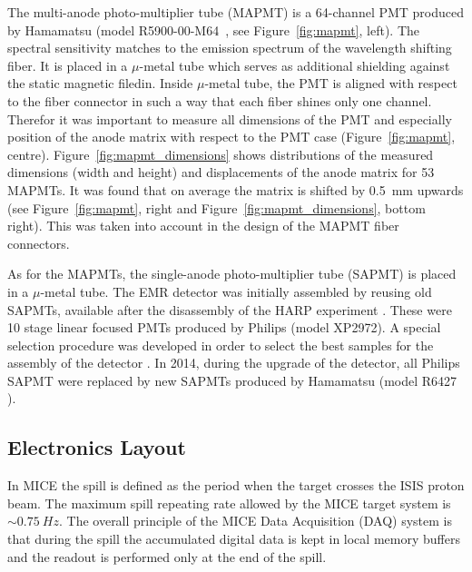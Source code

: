 \documentclass[a4paper,11pt]{article}
\begin{document}
The multi-anode photo-multiplier tube (MAPMT) is a 64-channel PMT produced by Hamamatsu (model R5900-00-M64~\cite{hamamatsu_mapmt}, see
Figure~\ref{fig:mapmt}, left). The spectral sensitivity matches to the emission spectrum of the wavelength shifting fiber. It is 
placed in a $\mu$-metal tube  which serves as additional shielding against the static magnetic filedin. Inside $\mu$-metal tube, the PMT
is aligned with respect to the fiber connector in such a way that each fiber shines only one
channel. Therefor it was important to measure all dimensions of the PMT and especially position of the anode matrix with respect to the
PMT case (Figure~\ref{fig:mapmt}, centre). Figure~\ref{fig:mapmt_dimensions} shows distributions of the measured dimensions (width and
height) and displacements of the anode matrix for 53 MAPMTs. It was found that on average the matrix is shifted by 0.5~mm upwards (see
Figure~\ref{fig:mapmt}, right and Figure~\ref{fig:mapmt_dimensions}, bottom right). This was taken into account in the design of the
MAPMT fiber connectors.

As for the MAPMTs, the single-anode photo-multiplier tube (SAPMT) is placed in a $\mu$-metal tube. The EMR detector was initially assembled
by reusing old SAPMTs, available after the disassembly of the HARP experiment \cite{harp}. These were 10 stage linear focused PMTs produced
by Philips (model XP2972). A special selection procedure was developed in order to select the best samples for the assembly of the detector
\cite{philips}. In 2014, during the upgrade of the detector, all Philips SAPMT were replaced by new SAPMTs produced by Hamamatsu (model R6427
\cite{hamamatsu_mapmt}).

\subsection{Electronics Layout}
In MICE the spill is defined as the period when the target crosses the ISIS proton beam. The maximum spill repeating rate allowed by the
MICE target system is $\sim 0.75 \ Hz$. The overall principle of the MICE Data Acquisition (DAQ) system is that during the spill the accumulated
digital data is kept in local memory buffers and the readout is performed only at the end of the spill.
\end{document}
